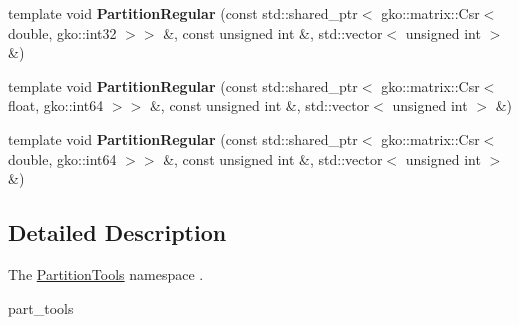 \begin{DoxyCompactItemize}
template void {\bfseries Partition\+Regular} (const std\+::shared\+\_\+ptr$<$ gko\+::matrix\+::\+Csr$<$ double, gko\+::int32 $>$$>$ \&, const unsigned int \&, std\+::vector$<$ unsigned int $>$ \&)
\item 
\mbox{\label{namespaceschwz_1_1PartitionTools_ae309b46e40996539cab104b01e671af8}} 
template void {\bfseries Partition\+Regular} (const std\+::shared\+\_\+ptr$<$ gko\+::matrix\+::\+Csr$<$ float, gko\+::int64 $>$$>$ \&, const unsigned int \&, std\+::vector$<$ unsigned int $>$ \&)
\item 
\mbox{\label{namespaceschwz_1_1PartitionTools_ac5e6e7e957a85bc5c10ddd051300a3bb}} 
template void {\bfseries Partition\+Regular} (const std\+::shared\+\_\+ptr$<$ gko\+::matrix\+::\+Csr$<$ double, gko\+::int64 $>$$>$ \&, const unsigned int \&, std\+::vector$<$ unsigned int $>$ \&)
\end{DoxyCompactItemize}


\subsection{Detailed Description}
The \hyperlink{namespaceschwz_1_1PartitionTools}{Partition\+Tools} namespace . 

part\+\_\+tools 